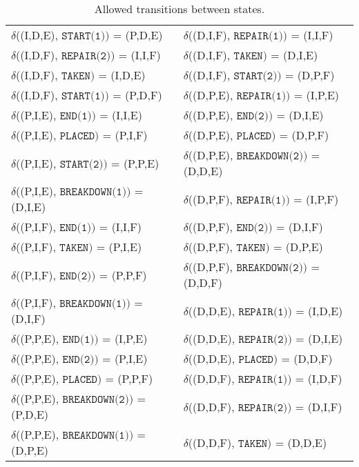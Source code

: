 \begin{table}[H]
\begin{tabular}{ll}
    $\delta$((I,D,E), $\texttt{START(1)})$ = (P,D,E)     & $\delta$((D,I,F), $\texttt{REPAIR(1)})$ = (I,I,F)     \\
    $\delta$((I,D,F), $\texttt{REPAIR(2)})$ = (I,I,F)    & $\delta$((D,I,F), $\texttt{TAKEN})$ = (D,I,E)         \\
    $\delta$((I,D,F), $\texttt{TAKEN})$ = (I,D,E)        & $\delta$((D,I,F), $\texttt{START(2)})$ = (D,P,F)      \\
    $\delta$((I,D,F), $\texttt{START(1)})$ = (P,D,F)     & $\delta$((D,P,E), $\texttt{REPAIR(1)})$ = (I,P,E)     \\
    $\delta$((P,I,E), $\texttt{END(1)})$ = (I,I,E)       & $\delta$((D,P,E), $\texttt{END(2)})$ = (D,I,E)        \\
    $\delta$((P,I,E), $\texttt{PLACED})$ = (P,I,F)       & $\delta$((D,P,E), $\texttt{PLACED})$ = (D,P,F)        \\
    $\delta$((P,I,E), $\texttt{START(2)})$ = (P,P,E)     & $\delta$((D,P,E), $\texttt{BREAKDOWN(2)})$ = (D,D,E)  \\
    $\delta$((P,I,E), $\texttt{BREAKDOWN(1)})$ = (D,I,E) & $\delta$((D,P,F), $\texttt{REPAIR(1)})$ = (I,P,F)     \\
    $\delta$((P,I,F), $\texttt{END(1)})$ = (I,I,F)       & $\delta$((D,P,F), $\texttt{END(2)})$ = (D,I,F)        \\
    $\delta$((P,I,F), $\texttt{TAKEN})$ = (P,I,E)        & $\delta$((D,P,F), $\texttt{TAKEN})$ = (D,P,E)         \\
    $\delta$((P,I,F), $\texttt{END(2)})$ = (P,P,F)       & $\delta$((D,P,F), $\texttt{BREAKDOWN(2)})$ = (D,D,F)  \\
    $\delta$((P,I,F), $\texttt{BREAKDOWN(1)})$ = (D,I,F) & $\delta$((D,D,E), $\texttt{REPAIR(1)})$ = (I,D,E)     \\
    $\delta$((P,P,E), $\texttt{END(1)})$ = (I,P,E)       & $\delta$((D,D,E), $\texttt{REPAIR(2)})$ = (D,I,E)     \\
    $\delta$((P,P,E), $\texttt{END(2)})$ = (P,I,E)       & $\delta$((D,D,E), $\texttt{PLACED})$ = (D,D,F)        \\
    $\delta$((P,P,E), $\texttt{PLACED})$ = (P,P,F)       & $\delta$((D,D,F), $\texttt{REPAIR(1)})$ = (I,D,F)     \\
    $\delta$((P,P,E), $\texttt{BREAKDOWN(2)})$ = (P,D,E) & $\delta$((D,D,F), $\texttt{REPAIR(2)})$ = (D,I,F)     \\
    $\delta$((P,P,E), $\texttt{BREAKDOWN(1)})$ = (D,P,E) & $\delta$((D,D,F), $\texttt{TAKEN})$ = (D,D,E)         \\

  \end{tabular}
  \caption{Allowed transitions between states.}
  \label{tbl:04.02_delta}
\end{table}

